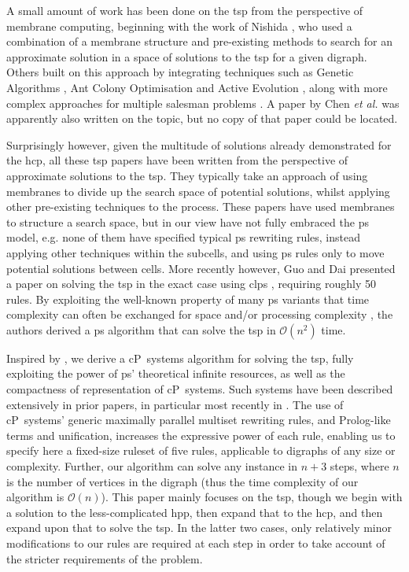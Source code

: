 A small amount of work has been done on the \gls{tsp} from the perspective of membrane computing, beginning with the work of Nishida \cite{Nishida2006}, who used a combination of a membrane structure and pre-existing methods to search for an approximate solution in a space of solutions to the \gls{tsp} for a given digraph.  Others built on this approach by integrating techniques such as Genetic Algorithms \cite{Manalastas2013,He2014}, Ant Colony Optimisation \cite{Zhang2011} and Active Evolution \cite{Song2015}, along with more complex approaches for multiple salesman problems \cite{He2015}.  A paper by Chen \textit{et al.} \cite{Chen2011} was apparently also written on the topic, but no copy of that paper could be located.

Surprisingly however, given the multitude of solutions already demonstrated for the \gls{hcp}, all these \gls{tsp} papers have been written from the perspective of approximate solutions to the \gls{tsp}.  They typically take an approach of using membranes to divide up the search space of potential solutions, whilst applying other pre-existing techniques to the process.  These papers have used membranes to structure a search space, but in our view have not fully embraced the \gls{ps} model, e.g. none of them have specified typical \gls{ps} rewriting rules, instead applying other techniques within the subcells, and using \gls{ps} rules only to move potential solutions between cells.  More recently however, Guo and Dai presented a paper on solving the \gls{tsp} in the exact case using \gls{clps} \cite{Guo2017}, requiring roughly 50 rules.  By exploiting the well-known property of many \gls{ps} variants that time complexity can often be exchanged for space and/or processing complexity \cite{Paun1999,Paun2002a,Jimenez2003,Song2017}, the authors derived a \gls{ps} algorithm that can solve the \gls{tsp} in \(\mathcal{O}(n^2)\) time.

Inspired by \cite{Guo2017}, we derive a cP~systems algorithm for solving the \gls{tsp}, fully exploiting the power of \gls{ps}' theoretical infinite resources, as well as the compactness of representation of cP~systems.  Such systems have been described extensively in prior papers, in particular most recently in \cite{Nicolescu2018a}.  The use of cP~systems' generic maximally parallel multiset rewriting rules, and Prolog-like terms and unification, increases the expressive power of each rule, enabling us to specify here a fixed-size ruleset of five rules, applicable to digraphs of any size or complexity.   Further, our algorithm can solve any instance in \(n + 3\) steps, where \(n\) is the number of vertices in the digraph (thus the time complexity of our algorithm is \(\mathcal{O}(n)\)).  This paper mainly focuses on the \gls{tsp}, though we begin with a solution to the less-complicated \gls{hpp}, then expand that to the \gls{hcp}, and then expand upon that to solve the \gls{tsp}.  In the latter two cases, only relatively minor modifications to our rules are required at each step in order to take account of the stricter requirements of the problem.

